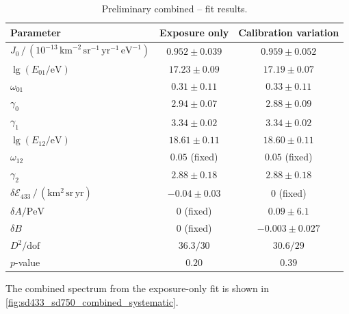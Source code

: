 \documentclass[main.tex]{subfiles}
\begin{document}
\begin{table}
    \centering
    \caption{Preliminary combined -- fit results.}
\label{table:combined_parameters_single}
    \begin{tabular}{lcc}
        \toprule
        Parameter & Exposure only & Calibration variation\\
        \midrule
        $J_0\,/\,(10^{-13}\,\mathrm{km}^{-2}\,\mathrm{sr}^{-1}\,\mathrm{yr}^{-1}\,\mathrm{eV}^{-1})$ & $0.952\pm0.039$ & $0.959\pm0.052$\\
        $\lg(E_{01}/\mathrm{eV})$ & $17.23\pm0.09$ & $17.19\pm0.07$\\
        $\omega_{01}$ & $0.31\pm0.11$ & $0.33\pm0.11$\\
        $\gamma_0$ & $2.94\pm0.07$ & $2.88\pm0.09$\\
        $\gamma_1$ & $3.34\pm0.02$ & $3.34\pm0.02$\\
        $\lg(E_{12}/\mathrm{eV})$ & $18.61\pm0.11$ & $18.60\pm0.11$\\
        $\omega_{12}$ & $0.05$ (fixed) & $0.05$ (fixed)\\
        $\gamma_2$ & $2.88\pm0.18$ & $2.88\pm0.18$\\
        \midrule
        $\delta\mathcal E_{433}\,/\,(\mathrm{km^2\,sr\,yr})$ & $-0.04\pm0.03$ & $0$ (fixed)\\
        $\delta A/\mathrm{PeV}$ & $0$ (fixed) & $0.09\pm6.1$\\
        $\delta B$ & $0$ (fixed) & $-0.003\pm0.027$\\
        \midrule
        $D^2/\mathrm{dof}$ & $36.3/30$ & $30.6/29$\\
        $p$-value & $0.20$ & $0.39$\\
        \bottomrule
    \end{tabular}
\end{table}
The combined spectrum from the exposure-only fit is shown in \cref{fig:sd433_sd750_combined_systematic}.
\end{document}
